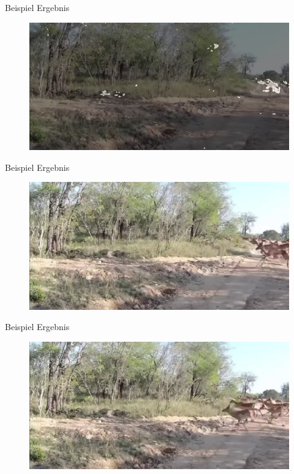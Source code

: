 \documentclass[hyperref={pdfpagelabels=false}]{beamer}
\begin{document}
\begin{frame}[t]{Beispiel Ergebnis}
	\vspace{1.3em}
	\begin{figure}
		\centering
		\includegraphics[width=0.8\linewidth]{Abbildungen/Einstieg/overlay_small.jpg}
	\end{figure}
\end{frame}

\begin{frame}[t]{Beispiel Ergebnis}
	\vspace{1.3em}
	\begin{figure}
		\centering
		\includegraphics[width=0.8\linewidth]{Abbildungen/Einstieg/original_small1.jpg}
	\end{figure}
\end{frame}


\begin{frame}[t]{Beispiel Ergebnis}
	\vspace{1.3em}
	\begin{figure}
		\centering
		\includegraphics[width=0.8\linewidth]{Abbildungen/Einstieg/original_small2.jpg}
	\end{figure}
\end{frame}
\end{document}

